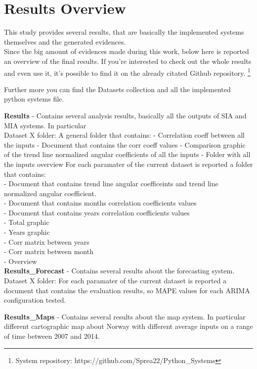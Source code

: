 \chapter{Results Overview}
This study provides several results, that are basically the implemented systems themselves and the generated evidences.\\
Since the big amount of evidences made during this work, below here is reported an overview of the final results. If you're interested to check out the whole results and even use it, it's possible to find it on the already citated Github repository. \footnote{System repository: https://github.com/Sprea22/Python\_Systems}

Further more you can find the Datasets collection and all the implemented python systems file.

\textbf{Results} - Contains several analysis results, basically all the outputs of SIA and MIA systems. In particular\\
Dataset X folder:
	A general folder that contains:
			- Correlation coeff between all the inputs
			- Document that contains the corr coeff values
			- Comparison graphic of the trend line normalized angular coefficients of all the inputs
			- Folder with all the inputs overview
	For each paramater of the current dataset is reported a folder that contains:\\
			- Document that contains trend line angular coefficeints and trend line normalized angular coefficient.\\	
			- Document that contains months correlation coefficients values\\
			- Document that contains years correlation coefficients values\\
			- Total graphic\\
			- Years graphic\\
			- Corr matrix between years\\
			- Corr matrix between month\\
			- Overview \\

\textbf{Results\_Forecast} - Contains several results about the forecasting system.
Dataset X folder: 
	For each paramater of the current dataset is reported a document that contains the evaluation results, so MAPE values for each ARIMA 	configuration tested.
		
\textbf{Results\_Maps} - Contains several results about the map system. In particular different cartographic map about Norway with different average inputs on a range of time between 2007 and 2014.
